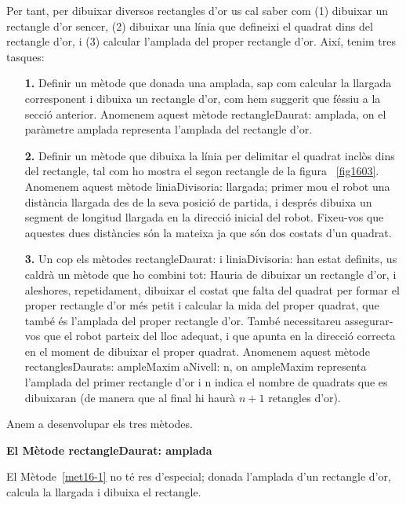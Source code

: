 Per tant, per dibuixar diversos rectangles d'or us cal saber com (1) dibuixar un rectangle d'or sencer, (2) dibuixar una línia que defineixi el quadrat dins del rectangle d'or, i (3) calcular l'amplada del proper rectangle d'or. Així, tenim tres tasques:
\begin{itemize}
\item[{\bf 1.}] Definir un mètode que donada una amplada, sap com calcular la llargada corresponent i dibuixa un rectangle d'or, com hem suggerit que féssiu a la secció anterior. Anomenem aquest mètode \textsf{rectangleDaurat: amplada}, on el paràmetre \textsf{amplada} representa l'amplada del rectangle d'or.
\item[{\bf 2.}] Definir un mètode que dibuixa la línia per delimitar el quadrat inclòs dins del rectangle, tal com ho mostra el segon rectangle de la figura ~\ref{fig1603}. Anomenem aquest mètode \textsf{liniaDivisoria: llargada}; primer mou el robot una distància \textsf{llargada} des de la seva posició de partida, i després dibuixa un segment de longitud \textsf{llargada} en la direcció inicial del robot. Fixeu-vos que aquestes dues distàncies són la mateixa ja que són dos costats d'un quadrat.
\item[{\bf 3.}] Un cop els mètodes \textsf{rectangleDaurat:} i \textsf{liniaDivisoria:} han estat definits, us caldrà un mètode que ho combini tot: Hauria de dibuixar un rectangle d'or, i aleshores, repetidament, dibuixar el costat que falta del quadrat per formar el proper rectangle d'or més petit i calcular la mida del proper quadrat, que també és l'amplada del proper rectangle d'or. També necessitareu assegurar-vos que el robot parteix del lloc adequat, i que apunta en la direcció correcta en el moment de dibuixar el proper quadrat.
Anomenem aquest mètode \textsf{rectanglesDaurats: ampleMaxim aNivell: n}, on \textsf{ampleMaxim} representa l'amplada del primer rectangle d'or i \textsf{n} indica el nombre de quadrats que es dibuixaran (de manera que al final hi haurà $n + 1$ retangles d'or).
\end{itemize}

Anem a desenvolupar els tres mètodes.

\vspace*{3mm}
\noindent
{\bf \large El Mètode \textsf{rectangleDaurat: amplada}}
\vspace*{3mm}

El Mètode~\ref{met16-1} no té res d'especial; donada l'amplada d'un rectangle d'or, calcula la llargada i dibuixa el rectangle.

